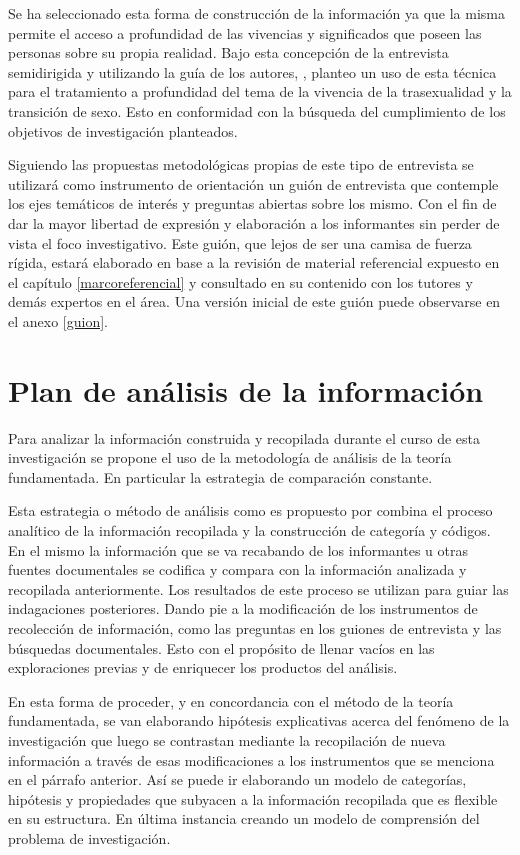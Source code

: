 Se ha seleccionado esta forma de construcción de la información ya que la misma
permite el acceso a profundidad de las vivencias y significados que poseen las
personas sobre su propia realidad. Bajo esta concepción de la entrevista
semidirigida y utilizando la guía de los autores,
\textcites{Colin1999}{Hidalgo2005}{Perpina2014}, planteo un uso de esta técnica
para el tratamiento a profundidad del tema de la vivencia de la trasexualidad y
la transición de sexo. Esto en conformidad con la búsqueda del cumplimiento de
los objetivos de investigación planteados.

Siguiendo las propuestas metodológicas propias de este tipo de entrevista se
utilizará como instrumento de orientación un guión de entrevista que contemple
los ejes temáticos de interés y preguntas abiertas sobre los mismo. Con el fin
de dar la mayor libertad de expresión y elaboración a los informantes sin perder
de vista el foco investigativo. Este guión, que lejos de ser una camisa de
fuerza rígida, estará elaborado en base a la revisión de material referencial
expuesto en el capítulo \ref{marcoreferencial} y consultado en su contenido con
los tutores y demás expertos en el área. Una versión inicial de este guión puede observarse en el anexo \ref{guion}.

\section{Plan de análisis de la información}

  Para analizar la información construida y recopilada durante el curso de esta
investigación se propone el uso de la metodología de análisis de la teoría
fundamentada. En particular la estrategia de comparación constante.

  Esta estrategia o método de análisis como es propuesto por \textcite[][p.
102]{Glaser1967} combina el proceso analítico de la información recopilada y la
construcción de categoría y códigos. En el mismo la información que se va
recabando de los informantes u otras fuentes documentales se codifica y compara
con la información analizada y recopilada anteriormente. Los resultados de este
proceso se utilizan para guiar las indagaciones posteriores. Dando pie a la
modificación de los instrumentos de recolección de información, como las
preguntas en los guiones de entrevista y las búsquedas documentales. Esto con el
propósito de llenar vacíos en las exploraciones previas y de enriquecer los
productos del análisis.

  En esta forma de proceder, y en concordancia con el método de la teoría
fundamentada, se van elaborando hipótesis explicativas acerca del fenómeno de la
investigación que luego se contrastan mediante la recopilación de nueva
información a través de esas modificaciones a los instrumentos que se menciona
en el párrafo anterior. Así se puede ir elaborando un modelo de categorías,
hipótesis y propiedades que subyacen a la información recopilada que es flexible
en su estructura. En última instancia creando un modelo de comprensión del
problema de investigación.

